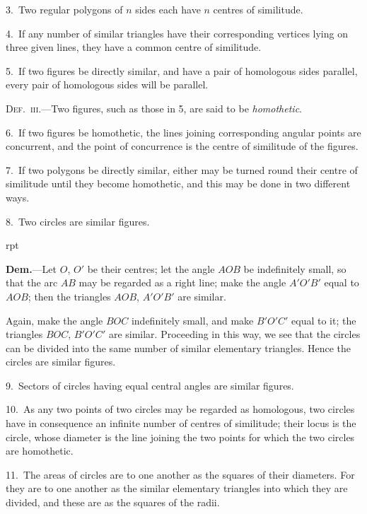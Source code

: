 \documentclass[oneside]{book}
\newcommand\imgflow[3]{
\setcounter{wrapwidth}{#1}
\begin{wrapfigure}[#2]{r}{\value{wrapwidth}pt}
\begin{center}
\vspace{-0.3in}
\end{center}
\end{wrapfigure}
}
\begin{document}
\smallskip
\begin{footnotesize}
3.~Two regular polygons of $n$ sides each have $n$ centres of
similitude.

4.~If any number of similar triangles have their corresponding
vertices lying on three given lines, they have a common centre of
similitude.

5.~If two figures be directly similar, and have a pair of homologous
sides parallel, every pair of homologous sides will be
parallel.
\par\end{footnotesize}

\textsc{Def.~iii.}---Two figures, such as those in 5, are said
to be \emph{homothetic}.

\smallskip
\begin{footnotesize}
6.~If two figures be homothetic, the lines joining corresponding
angular points are concurrent, and the point of concurrence is the
centre of similitude of the figures.

7.~If two polygons be directly similar, either may be turned
round their centre of similitude until they become homothetic,
and this may be done in two different ways.

8.~Two circles are similar figures.

\imgflow{235}{12}{f201}

\textbf{Dem.}---Let $O$, $O'$ be their centres; let the angle $AOB$ be
indefinitely
small, so that
the arc $AB$
may be regarded
as a
right line;
make the
angle $A'O'B'$
equal to $AOB$;
then the triangles
$AOB$,
$A'O'B'$ are similar.

Again, make the angle $BOC$ indefinitely small, and make $B'O'C'$
equal to it; the triangles $BOC$, $B'O'C'$ are similar. Proceeding
in this way, we see that the circles can be divided into the same
number of similar elementary triangles. Hence the circles are
similar figures.

9.~Sectors of circles having equal central angles are similar
figures.

10.~As any two points of two circles may be regarded as homologous,
two circles have in consequence an infinite number of
centres of similitude; their locus is the circle, whose diameter is
the line joining the two points for which the two circles are
homothetic.

11.~The areas of circles are to one another as the squares of
their diameters. For they are to one another as the similar
elementary triangles into which they are divided, and these are
as the squares of the radii.


\end{footnotesize}
\end{document}
